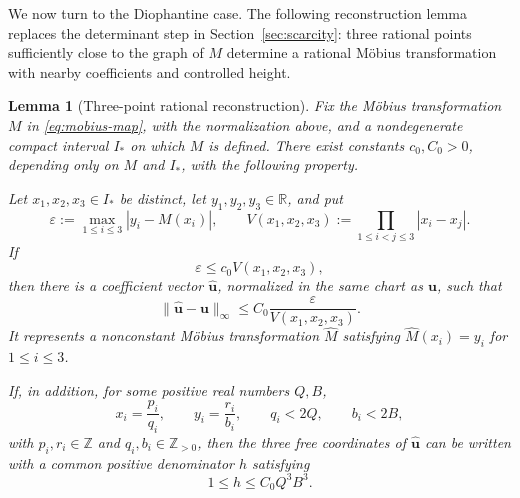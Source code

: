 \documentclass[11pt]{amsart}
\numberwithin{equation}{section}
\newtheorem{lemma}[lemma]{Lemma}
\theoremstyle{definition}
\theoremstyle{remark}
\newcommand{\R}{\mathbb R}
\newcommand{\Z}{\mathbb Z}
\begin{document}
We now turn to the Diophantine case. The following reconstruction
lemma replaces the determinant step in Section~\ref{sec:scarcity}:
three rational points sufficiently close to the graph of \(M\)
determine a rational M\"obius transformation with nearby coefficients
and controlled height.

\begin{lemma}[Three-point rational reconstruction]
\label{lem:mobius-reconstruction}
Fix the M\"obius transformation \(M\) in \eqref{eq:mobius-map}, with the
normalization above, and a nondegenerate compact interval \(I_*\) on
which \(M\) is defined. There exist constants \(c_0,C_0>0\), depending
only on \(M\) and \(I_*\), with the following property.

Let \(x_1,x_2,x_3\in I_*\) be distinct, let \(y_1,y_2,y_3\in\R\), and
put
\[
\varepsilon:=\max_{1\leq i\leq3}|y_i-M(x_i)|,
\qquad
V(x_1,x_2,x_3):=\prod_{1\leq i<j\leq3}|x_i-x_j|.
\]
If
\begin{equation}\label{eq:mobius-reconstruction-smallness}
\varepsilon\leq c_0V(x_1,x_2,x_3),
\end{equation}
then there is a coefficient vector \(\widehat{\mathbf u}\), normalized
in the same chart as \(\mathbf u\), such that
\begin{equation}\label{eq:mobius-reconstruction-distance}
\|\widehat{\mathbf u}-\mathbf u\|_\infty
\leq
C_0\frac{\varepsilon}{V(x_1,x_2,x_3)}.
\end{equation}
It represents a nonconstant M\"obius transformation
\(\widehat M\) satisfying \(\widehat M(x_i)=y_i\) for \(1\leq i\leq3\).

If, in addition, for some positive real numbers $Q,B$,
\[
x_i=\frac{p_i}{q_i},
\qquad
y_i=\frac{r_i}{b_i},
\qquad
q_i<2Q,
\qquad
b_i<2B,
\]
with \(p_i,r_i\in\Z\) and \(q_i,b_i\in\Z_{>0}\), then the three free
coordinates of \(\widehat{\mathbf u}\) can be written with a common
positive denominator \(h\) satisfying
\begin{equation}\label{eq:mobius-reconstruction-height}
1\leq h\leq C_0Q^3B^3.
\end{equation}
\end{lemma}
\end{document}
